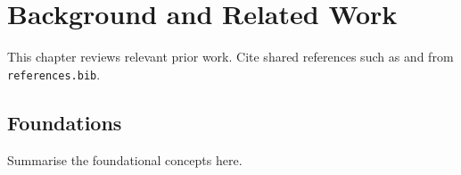 \chapter{Background and Related Work}
\label{ch:background}

This chapter reviews relevant prior work. Cite shared references such as
\textcite{example2020key} and \textcite{author2021conf} from \texttt{references.bib}.

\section{Foundations}
\label{sec:foundations}

Summarise the foundational concepts here.
